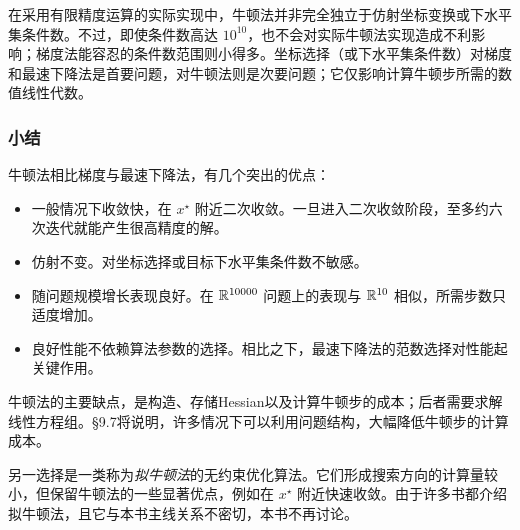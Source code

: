 在采用有限精度运算的实际实现中，牛顿法并非完全独立于仿射坐标变换或下水平集条件数。不过，即使条件数高达 $10^{10}$，也不会对实际牛顿法实现造成不利影响；梯度法能容忍的条件数范围则小得多。坐标选择（或下水平集条件数）对梯度和最速下降法是首要问题，对牛顿法则是次要问题；它仅影响计算牛顿步所需的数值线性代数。

\subsubsection*{小结}
牛顿法相比梯度与最速下降法，有几个突出的优点：
\begin{itemize}
\item 一般情况下收敛快，在 $x^\star$ 附近二次收敛。一旦进入二次收敛阶段，至多约六次迭代就能产生很高精度的解。
\item 仿射不变。对坐标选择或目标下水平集条件数不敏感。
\item 随问题规模增长表现良好。在 $\mathbb R^{10000}$ 问题上的表现与 $\mathbb R^{10}$ 相似，所需步数只适度增加。
\item 良好性能不依赖算法参数的选择。相比之下，最速下降法的范数选择对性能起关键作用。
\end{itemize}
牛顿法的主要缺点，是构造、存储Hessian以及计算牛顿步的成本；后者需要求解线性方程组。§9.7将说明，许多情况下可以利用问题结构，大幅降低牛顿步的计算成本。

另一选择是一类称为\emph{拟牛顿法}的无约束优化算法。它们形成搜索方向的计算量较小，但保留牛顿法的一些显著优点，例如在 $x^\star$ 附近快速收敛。由于许多书都介绍拟牛顿法，且它与本书主线关系不密切，本书不再讨论。
